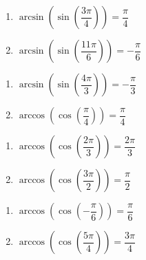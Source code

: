 \documentclass{ximera}
\begin{document}
\begin{multicols}{2}

\begin{enumerate}

\setcounter{enumi}{\value{HW}}

\item  $\arcsin\left(\sin\left(\dfrac{3\pi}{4}\right) \right) = \dfrac{\pi}{4}$
\item  $\arcsin\left(\sin\left(\dfrac{11\pi}{6}\right) \right) = -\dfrac{\pi}{6}$

\setcounter{HW}{\value{enumi}}

\end{enumerate}

\end{multicols}

\begin{multicols}{2}

\begin{enumerate}

\setcounter{enumi}{\value{HW}}

\item  $\arcsin\left(\sin\left(\dfrac{4\pi}{3}\right) \right) = -\dfrac{\pi}{3}$
\item  $\arccos\left(\cos\left(\dfrac{\pi}{4}\right) \right) = \dfrac{\pi}{4}$ 

\setcounter{HW}{\value{enumi}}

\end{enumerate}

\end{multicols}

\begin{multicols}{2}

\begin{enumerate}

\setcounter{enumi}{\value{HW}}

\item  $\arccos\left(\cos\left(\dfrac{2\pi}{3}\right) \right) = \dfrac{2\pi}{3}$
\item  $\arccos\left(\cos\left(\dfrac{3\pi}{2}\right) \right) = \dfrac{\pi}{2}$

\setcounter{HW}{\value{enumi}}

\end{enumerate}

\end{multicols}

\begin{multicols}{2}

\begin{enumerate}

\setcounter{enumi}{\value{HW}}

\item  $\arccos\left(\cos\left(-\dfrac{\pi}{6}\right) \right) = \dfrac{\pi}{6}$ 
\item  $\arccos\left(\cos\left(\dfrac{5\pi}{4}\right) \right) = \dfrac{3\pi}{4}$

\setcounter{HW}{\value{enumi}}

\end{enumerate}

\end{multicols}
\end{document}
